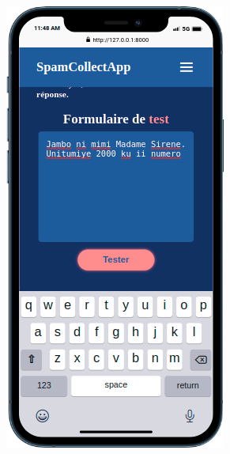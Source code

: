 \documentclass[12pt,a4paper, oneside]{book}
\begin{document}
\begin{figure}[h]
\begin{subfigure}{3.5cm}
		\caption{}
		\label{fig:formCompleted}
	\end{subfigure}
	\begin{subfigure}{3.5cm}
		\centering
		\includegraphics[width=1\linewidth]{CollectImages/formCompleted.png}

\end{subfigure}
\end{figure}
\end{document}
